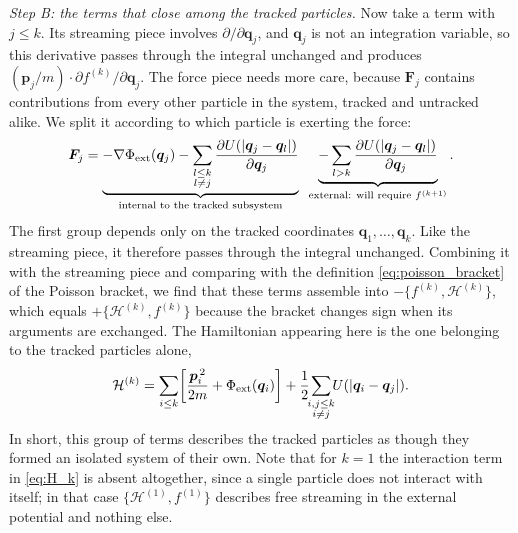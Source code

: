 \documentclass[12pt]{article}
\renewcommand{\vec}[1]{\bm{#1}}
\begin{document}
\emph{Step B: the terms that close among the tracked particles.}  Now
take a term with $j\le k$.  Its streaming piece involves
$\partial/\partial\vec q_j$, and $\vec q_j$ is not an integration
variable, so this derivative passes through the integral unchanged and
produces $(\vec p_j/m)\cdot\partial f^{(k)}/\partial\vec q_j$.  The
force piece needs more care, because $\vec F_j$ contains contributions
from every other particle in the system, tracked and untracked alike.
We split it according to which particle is exerting the force:
%
\begin{equation}
  \vec F_j =
    \underbrace{-\nabla\Phi_{\rm ext}(\vec q_j)
      - \sum_{\substack{l\le k\\ l\neq j}}
        \frac{\partial U(|\vec q_j-\vec q_l|)}{\partial\vec q_j}}
      _{\text{internal to the tracked subsystem}}
    \;\;
    \underbrace{-\sum_{l>k}
        \frac{\partial U(|\vec q_j-\vec q_l|)}{\partial\vec q_j}}
      _{\text{external: will require } f^{(k+1)}}.
  \label{eq:force_split}
\end{equation}
%
The first group depends only on the tracked coordinates
$\vec q_1,\ldots,\vec q_k$.  Like the streaming piece, it therefore
passes through the integral unchanged.  Combining it with the streaming
piece and comparing with the definition \eqref{eq:poisson_bracket} of
the Poisson bracket, we find that these terms assemble into
$-\{f^{(k)},\mathcal H^{(k)}\}$, which equals
$+\{\mathcal H^{(k)},f^{(k)}\}$ because the bracket changes sign when
its arguments are exchanged.  The Hamiltonian appearing here is the one
belonging to the tracked particles alone,
%
\begin{equation}
  \mathcal H^{(k)} = \sum_{i\le k}\!\left[\frac{\vec p_i^{\,2}}{2m}
     + \Phi_{\rm ext}(\vec q_i)\right]
     + \frac12\!\!\sum_{\substack{i,j\le k\\ i\neq j}}\!\! U(|\vec q_i-\vec q_j|).
  \label{eq:H_k}
\end{equation}
%
In short, this group of terms describes the tracked particles as though
they formed an isolated system of their own.  Note that for $k=1$ the
interaction term in \eqref{eq:H_k} is absent altogether, since a single
particle does not interact with itself; in that case
$\{\mathcal H^{(1)},f^{(1)}\}$ describes free streaming in the external
potential and nothing else.
\end{document}
